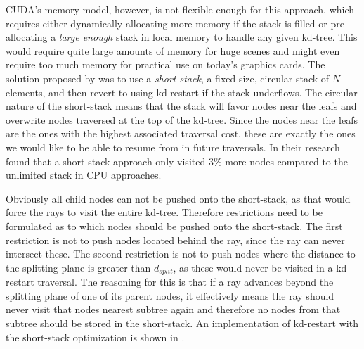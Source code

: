 CUDA's memory model, however, is not flexible enough for this approach, which
requires either dynamically allocating more memory if the stack is filled or
pre-allocating a \textit{large enough} stack in local memory to handle any given
kd-tree. This would require quite large amounts of memory for huge scenes and
might even require too much memory for practical use on today's graphics
cards. The solution proposed by \horn{} was to use a \textit{short-stack}, a
fixed-size, circular stack of $N$ elements, and then revert to using kd-restart
if the stack underflows. The circular nature of the short-stack means that the
stack will favor nodes near the leafs and overwrite nodes traversed at the top
of the kd-tree. Since the nodes near the leafs are the ones with the highest
associated traversal cost, these are exactly the ones we would like to be able
to resume from in future traversals. In their research \horn{} found that a
short-stack approach only visited 3\% more nodes compared to the unlimited stack
in CPU approaches.


Obviously all child nodes can not be pushed onto the short-stack, as that would
force the rays to visit the entire kd-tree. Therefore restrictions need to be
formulated as to which nodes should be pushed onto the short-stack. The first
restriction is not to push nodes located behind the ray, since the ray can never
intersect these. The second restriction is not to push nodes where the distance
to the splitting plane is greater than $d_{split}$, as these would never be
visited in a kd-restart traversal. The reasoning for this is that if a ray
advances beyond the splitting plane of one of its parent nodes, it effectively
means the ray should never visit that nodes nearest subtree again and therefore
no nodes from that subtree should be stored in the short-stack. An
implementation of kd-restart with the short-stack optimization is shown in
.

